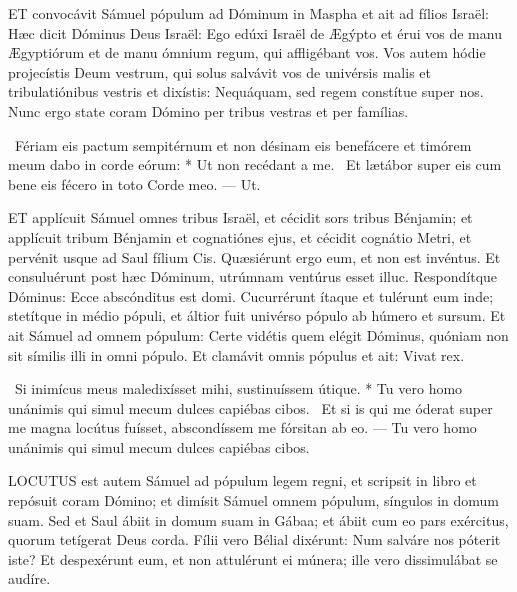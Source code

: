 



\lettrine[lines=2]{E}{T} convocávit Sámuel pópulum ad Dóminum in Maspha et ait ad fílios Israël: Hæc dicit Dóminus Deus Israël: Ego edúxi Israël de Ægýpto et érui vos de manu Ægyptiórum et de manu ómnium regum, qui affligébant vos. Vos autem hódie projecístis Deum vestrum, qui solus salvávit vos de univérsis malis et tribulatiónibus vestris et dixístis: Nequáquam, sed regem constítue super nos. Nunc ergo state coram Dómino per tribus vestras et per famílias.

\R\ Fériam eis pactum sempitérnum et non désinam eis benefácere et timórem meum dabo in corde eórum: * Ut non recédant a me. \V\ Et lætábor super eis cum bene eis fécero in toto Corde meo. --- Ut.


\lettrine[lines=2]{E}{T} applícuit Sámuel omnes tribus Israël, et cécidit sors tribus Bénjamin; et applícuit tribum Bénjamin et cognatiónes ejus, et cécidit cognátio Metri, et pervénit usque ad Saul fílium Cis. Quæsiérunt ergo eum, et non est invéntus. Et consuluérunt post hæc Dóminum, utrúmnam ventúrus esset illuc. Respondítque Dóminus: Ecce abscónditus est domi. Cucurrérunt ítaque et tulérunt eum inde; stetítque in médio pópuli, et áltior fuit univérso pópulo ab húmero et sursum. Et ait Sámuel ad omnem pópulum: Certe vidétis quem elégit Dóminus, quóniam non sit símilis illi in omni pópulo. Et clamávit omnis pópulus et ait: Vivat rex.

\R\ Si inimícus meus maledixísset mihi, sustinuíssem útique. * Tu vero homo unánimis qui simul mecum dulces capiébas cibos. \V\ Et si is qui me óderat super me magna locútus fuísset, abscondíssem me fórsitan ab eo. --- Tu vero homo unánimis qui simul mecum dulces capiébas cibos.


\lettrine[lines=2]{L}{OCUTUS} est autem Sámuel ad pópulum legem regni, et scripsit in libro et repósuit coram Dómino; et dimísit Sámuel omnem pópulum, síngulos in domum suam. Sed et Saul ábiit in domum suam in Gábaa; et ábiit cum eo pars exércitus, quorum tetígerat Deus corda. Fílii vero Bélial dixérunt: Num salváre nos póterit iste? Et despexérunt eum, et non attulérunt ei múnera; ille vero dissimulábat se audíre.

